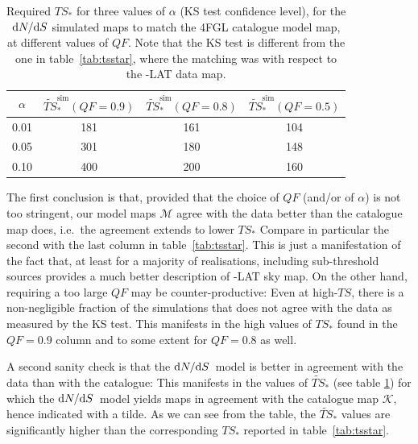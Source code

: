 \begin{table}[!h]
    \renewcommand{\arraystretch}{1.2}
    \centering
    \begin{tabular}{c|c|c|c}   
        $\alpha$ & $\widetilde{TS}_*^\textrm{sim}(QF=0.9)$& $\widetilde{TS}_*^\textrm{sim}(QF=0.8)$& $\widetilde{TS}_*^\textrm{sim}(QF=0.5)$\\
        \hline 
       0.01  & 181 & 161 & 104 \\ 
        \hline 
       0.05  & 301 & 180 &  148\\ 
        \hline 
       0.10  & 400 & 200 &  160\\
    \end{tabular}
\caption{Required $TS_*$ for three values of $\alpha$ (KS test confidence level), for the $\textrm{d}N/\textrm{d}S$ simulated maps to match the 4FGL catalogue model map, at different values of $QF$. Note that the KS test is different from the one in table~\ref{tab:tsstar}, where the matching was with respect to the \Fermi-LAT data map.}  
\label{tab:ts4FGL}
\end{table}
The first conclusion is that, provided that the choice of $QF$ (and/or  of $\alpha$) is not too stringent, 
 our model maps $\mathcal{M}$ agree with the data better than the catalogue map does, i.e.~the agreement extends to lower $TS_*$\: Compare in particular the second with the last column in table~\ref{tab:tsstar}. This is just a manifestation of the fact that, at least for a majority of realisations, including sub-threshold sources provides a much better description of \Fermi-LAT sky map. On the other hand, requiring a too large $QF$ may be counter-productive: Even at high-$TS$, there is a non-negligible fraction of the simulations that does not agree with the data as measured by the KS test.  This manifests in the high values of $TS_*$ found in the $QF=0.9$ column and to some extent for $QF=0.8$ as well.
%

A second sanity check is that  the $\textrm{d}N/\textrm{d}S$~model is better in agreement with the data than with the catalogue: This manifests in the values of $\widetilde{TS}_*$ (see table \ref{tab:ts4FGL}) for which the $\textrm{d}N/\textrm{d}S$~model yields maps in agreement  with the catalogue map $\mathcal{K}$, hence indicated with a tilde. As we can see from the table, the $\widetilde{TS}_*$ values are significantly higher than the corresponding $TS_*$ reported in table~\ref{tab:tsstar}.


